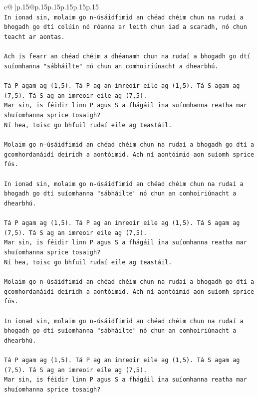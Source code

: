\documentclass{article}
\begin{document}
{\begin{supertabular}{c@{$\;$}|p{.15\linewidth}@{}p{.15\linewidth}p{.15\linewidth}p{.15\linewidth}p{.15\linewidth}p{.15\linewidth}}
{{{\\ 
\texttt{In ionad sin, molaim go n{-}úsáidfimid an chéad chéim chun na rudaí a bhogadh go dtí colúin nó róanna ar leith chun iad a scaradh, nó chun teacht ar aontas.} \\
\\ 
\texttt{Ach is fearr an chéad chéim a dhéanamh chun na rudaí a bhogadh go dtí suíomhanna "sábháilte" nó chun an comhoiriúnacht a dhearbhú.} \\
\\ 
\texttt{Tá P agam ag (1,5). Tá P ag an imreoir eile ag (1,5). Tá S agam ag (7,5). Tá S ag an imreoir eile ag (7,5).} \\
\texttt{Mar sin, is féidir linn P agus S a fhágáil ina suíomhanna reatha mar shuíomhanna sprice tosaigh?} \\
\texttt{Ní hea, toisc go bhfuil rudaí eile ag teastáil.} \\
\\ 
\texttt{Molaim go n{-}úsáidfimid an chéad chéim chun na rudaí a bhogadh go dtí a gcomhordanáidí deiridh a aontóimid. Ach ní aontóimid aon suíomh sprice fós.} \\
\\ 
\texttt{In ionad sin, molaim go n{-}úsáidfimid an chéad chéim chun na rudaí a bhogadh go dtí suíomhanna "sábháilte" nó chun an comhoiriúnacht a dhearbhú.} \\
\\ 
\texttt{Tá P agam ag (1,5). Tá P ag an imreoir eile ag (1,5). Tá S agam ag (7,5). Tá S ag an imreoir eile ag (7,5).} \\
\texttt{Mar sin, is féidir linn P agus S a fhágáil ina suíomhanna reatha mar shuíomhanna sprice tosaigh?} \\
\texttt{Ní hea, toisc go bhfuil rudaí eile ag teastáil.} \\
\\ 
\texttt{Molaim go n{-}úsáidfimid an chéad chéim chun na rudaí a bhogadh go dtí a gcomhordanáidí deiridh a aontóimid. Ach ní aontóimid aon suíomh sprice fós.} \\
\\ 
\texttt{In ionad sin, molaim go n{-}úsáidfimid an chéad chéim chun na rudaí a bhogadh go dtí suíomhanna "sábháilte" nó chun an comhoiriúnacht a dhearbhú.} \\
\\ 
\texttt{Tá P agam ag (1,5). Tá P ag an imreoir eile ag (1,5). Tá S agam ag (7,5). Tá S ag an imreoir eile ag (7,5).} \\
\texttt{Mar sin, is féidir linn P agus S a fhágáil ina suíomhanna reatha mar shuíomhanna sprice tosaigh?} \\
}}}
\end{supertabular}}
\end{document}
